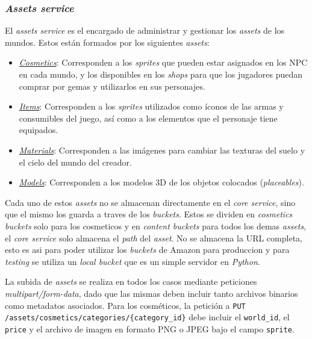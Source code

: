 \subsubsection{\textit{Assets service}}
\label{sec:assets-service}

El \textit{assets service} es el encargado de administrar y gestionar los \textit{assets} de los mundos. Estos están
formados por los siguientes \textit{assets}:

\begin{itemize}
    \item \underline{\textit{Cosmetics}}: Corresponden a los \textit{sprites} que pueden estar asignados en los NPC en cada mundo, y los 
    disponibles en los \textit{shops} para que los jugadores puedan comprar por gemas y utilizarlos en sus personajes.
    \item \underline{\textit{Items}}: Corresponden a los \textit{sprites} utilizados como íconos de las armas y consumibles
    del juego, así como a los elementos que el personaje tiene equipados.
    \item \underline{\textit{Materials}}: Corresponden a las imágenes para cambiar las texturas del suelo y el cielo
    del mundo del creador.
    \item \underline{\textit{Models}}: Corresponden a los modelos 3D de los objetos colocados (\textit{placeables}).
\end{itemize}

Cada uno de estos \textit{assets} no se almacenan directamente en el \textit{core service}, sino que el mismo los guarda
a traves de los \textit{buckets}. Estos se dividen en \textit{cosmetics buckets} solo para los cosmeticos y en \textit{content buckets}
para todos los demas \textit{assets}, el \textit{core service} solo almacena el \textit{path} del \textit{asset}. No se almacena
la URL completa, esto es asi para poder utilizar los \textit{buckets} de Amazon para produccion y para \textit{testing}
se utiliza un \textit{local bucket} que es un simple servidor en \textit{Python}.
\vspace{0.25cm}

La subida de \textit{assets} se realiza en todos los casos mediante peticiones \textit{multipart/form-data}, dado que
las mismas deben incluir tanto archivos binarios como metadatos asociados. Para los cosméticos, la petición a
\texttt{PUT /assets/cosmetics/categories/\{category\_id\}} debe incluir el \texttt{world\_id}, el \texttt{price} y
el archivo de imagen en formato PNG o JPEG bajo el campo \texttt{sprite}. 
\vspace{0.25cm}

